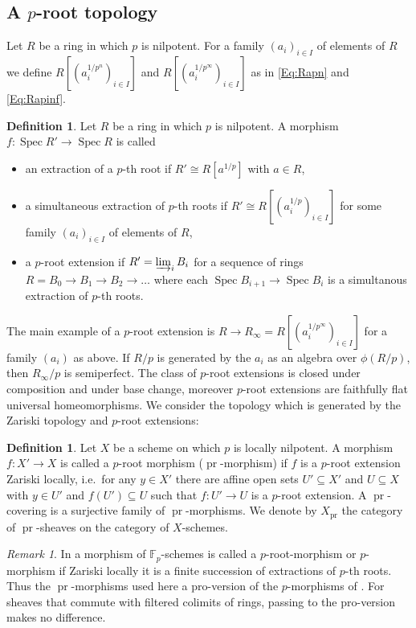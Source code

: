 \documentclass[a4paper,11pt]{article}
\theoremstyle{plain}
\theoremstyle{definition}
\newtheorem{Defn}[Lemma]{Definition}
\theoremstyle{remark}
\newtheorem{Remark}[Lemma]{Remark}
\theoremstyle{definition}
\numberwithin{Lemma}{section}
\numberwithin{Subpoint}{Lemma}
\numberwithin{equation}{section}
\newcommand{\FF}{{\mathbb{F}}}
\DeclareMathOperator{\Spec}{Spec}
\newcommand{\nameoftop}{{\operatorname{pr}}}
\newcommand{\chang}[1]{{#1}}
\begin{document}
\subsection{A $p$-root topology}
\label{Subsect:pr}

Let $R$ be a ring in which $p$ is nilpotent.
For a family $(a_i)_{i\in I}$ of elements of $R$ we define 
$R[(a_i^{1/p^n})_{i\in I}]$ and $R[(a_i^{1/p^\infty})_{i\in I}]$
as in \eqref{Eq:Rapn} and \eqref{Eq:Rapinf}.

\begin{Defn}
Let $R$ be a ring in which $p$ is nilpotent.
A morphism $f:\Spec R'\to\Spec R$ is called
\begin{itemize}
\item
an extraction of a $p$-th root if $R'\cong R[a^{1/p}]$ with $a\in R$,
\item
a simultaneous extraction of $p$-th roots
if $R'\cong R[(a_i^{1/p})_{i\in I}]$ for some family $(a_i)_{i\in I}$ of elements of $R$,
\item
a $p$-root extension if $R'=\varinjlim_i B_i$ 
for a sequence of rings $R=B_0\to B_1\to B_2\to\ldots$
where each $\Spec B_{i+1}\to\Spec B_{i}$ 
is a simultanous extraction of $p$-th roots.
\end{itemize}
\end{Defn}

The main example of a $p$-root extension is
$R\to R_\infty=R[(a_i^{1/p^\infty})_{i\in I}]$
for a family $(a_i)$ as above.
If $R/p$ is generated by the $a_i$ as an algebra over $\phi(R/p)$,
then $R_\infty/p$ is semiperfect.
The class of $p$-root extensions is closed under composition
and under base change,
moreover $p$-root extensions are faithfully flat universal homeomorphisms.
We consider the topology which is generated
by the Zariski topology and $p$-root extensions:

\begin{Defn}
\label{Def:top}
Let $X$ be a scheme on which $p$ is locally nilpotent.
A  morphism $f:X'\to X$ 
is called a $p$-root morphism ($\nameoftop$-morphism) 
if $f$ is a $p$-root extension Zariski locally, 
i.e.\ for \chang{any} $y\in X'$ there are affine open
sets $U'\subseteq X'$ and $U\subseteq X$ with $y\in U'$ and $f(U')\subseteq U$
such that $f:U'\to U$ is a $p$-root extension. 
A $\nameoftop$-covering is a surjective family of $\nameoftop$-morphisms.
We denote by $X_\nameoftop$ the category of $\nameoftop$-sheaves on
the category of $X$-schemes.
\end{Defn}

\begin{Remark}
In \cite{Fontaine-Jannsen} a morphism of $\FF_p$-schemes 
is called a $p$-root-morphism or $p$-morphism if Zariski locally 
it is a finite succession of extractions of $p$-th roots.
Thus the $\nameoftop$-morphisms used here a pro-version of the 
$p$-morphisms of \cite{Fontaine-Jannsen}.
For sheaves that commute with filtered colimits of rings, 
passing to the pro-version makes no difference.
\end{Remark}
\end{document}
